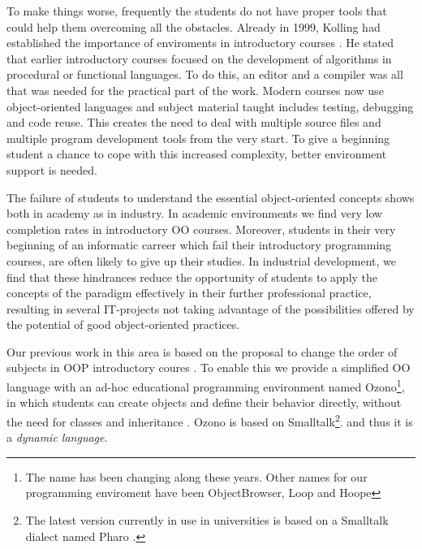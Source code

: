 To make things worse, frequently the students do not have proper tools that could help them overcoming all the obstacles.
Already in 1999, Kolling \etal had established the importance of enviroments in introductory courses \cite{kolling_problem_1999}. 
He stated that earlier introductory courses focused on the development of algorithms in procedural or functional languages. 
To do this, an editor and a compiler was all that was needed for the practical part of the work. 
Modern courses now use object-oriented languages and subject material taught includes testing, debugging and code reuse. 
This creates the need to deal with multiple source files and multiple program development tools from the very start. 
To give a beginning student a chance to cope with this increased complexity, better environment support is needed. 

\medskip


The failure of students to understand the essential object-oriented concepts shows both in academy as in industry.
In academic environments we find very low completion rates in introductory OO courses.
Moreover, students in their very beginning of an informatic carreer which fail their introductory programming courses, are often likely to give up their studies.
In industrial development, we find that these hindrances reduce the opportunity of students to apply
the concepts of the paradigm effectively in their further
professional practice, resulting in several IT-projects not taking
advantage of the possibilities offered by the potential of good
object-oriented practices. \cite{lombardi_instances_2007}

\medskip 


Our previous work in this area is based on the proposal to change the order of subjects in OOP introductory coures \cite{lombardi_instances_2007}.
To enable this we provide a simplified OO language with an ad-hoc educational programming environment 
named Ozono\footnote{The name has been changing along these years. Other names for our programming enviroment have been ObjectBrowser, Loop and Hoope}, 
in which students can create objects and define their behavior directly, without the need for classes and inheritance \cite{griggio_programming_2011}.
Ozono is based on Smalltalk\footnote{The latest version currently in use in universities is based on a Smalltalk dialect named Pharo \cite{black_pharo_2010}.}.
and thus it is a \textit{dynamic language}.

